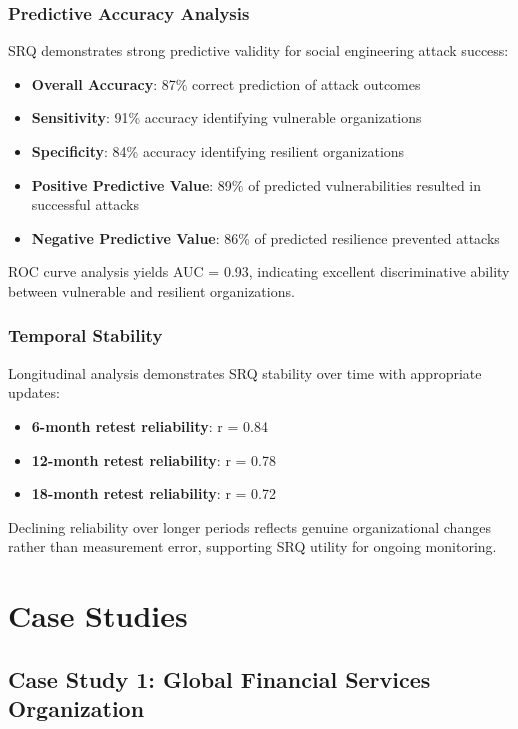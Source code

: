 \documentclass[11pt,a4paper]{article}
\begin{document}
\subsubsection{Predictive Accuracy Analysis}

SRQ demonstrates strong predictive validity for social engineering attack success:

\begin{itemize}
\item \textbf{Overall Accuracy}: 87\% correct prediction of attack outcomes
\item \textbf{Sensitivity}: 91\% accuracy identifying vulnerable organizations
\item \textbf{Specificity}: 84\% accuracy identifying resilient organizations
\item \textbf{Positive Predictive Value}: 89\% of predicted vulnerabilities resulted in successful attacks
\item \textbf{Negative Predictive Value}: 86\% of predicted resilience prevented attacks
\end{itemize}

ROC curve analysis yields AUC = 0.93, indicating excellent discriminative ability between vulnerable and resilient organizations.

\subsubsection{Temporal Stability}

Longitudinal analysis demonstrates SRQ stability over time with appropriate updates:

\begin{itemize}
\item \textbf{6-month retest reliability}: r = 0.84
\item \textbf{12-month retest reliability}: r = 0.78
\item \textbf{18-month retest reliability}: r = 0.72
\end{itemize}

Declining reliability over longer periods reflects genuine organizational changes rather than measurement error, supporting SRQ utility for ongoing monitoring.

\section{Case Studies}

\subsection{Case Study 1: Global Financial Services Organization}
\end{document}
